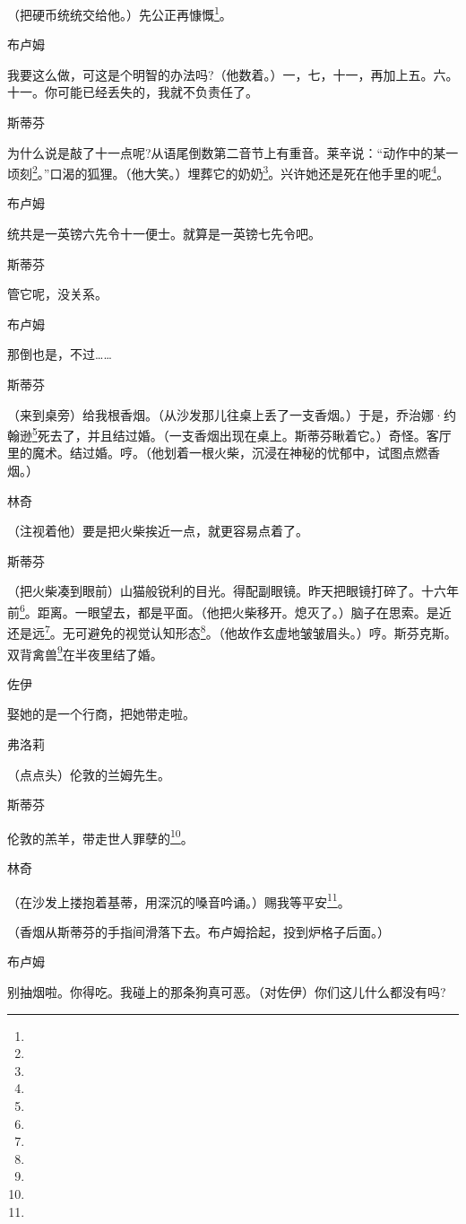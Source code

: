 \par （把硬币统统交给他。）先公正再慷慨\footnote{}。
\par 布卢姆
\par 我要这么做，可这是个明智的办法吗?（他数着。）一，七，十一，再加上五。六。十一。你可能已经丢失的，我就不负责任了。
\par 斯蒂芬
\par 为什么说是敲了十一点呢?从语尾倒数第二音节上有重音。莱辛说：“动作中的某一顷刻\footnote{}。”口渴的狐狸。（他大笑。）埋葬它的奶奶\footnote{}。兴许她还是死在他手里的呢\footnote{}。
\par 布卢姆
\par 统共是一英镑六先令十一便士。就算是一英镑七先令吧。
\par 斯蒂芬
\par 管它呢，没关系。
\par 布卢姆
\par 那倒也是，不过……
\par 斯蒂芬
\par （来到桌旁）给我根香烟。（从沙发那儿往桌上丢了一支香烟。）于是，乔治娜·约翰逊\footnote{}死去了，并且结过婚。（一支香烟出现在桌上。斯蒂芬瞅着它。）奇怪。客厅里的魔术。结过婚。哼。（他划着一根火柴，沉浸在神秘的忧郁中，试图点燃香烟。）
\par 林奇
\par （注视着他）要是把火柴挨近一点，就更容易点着了。
\par 斯蒂芬
\par （把火柴凑到眼前）山猫般锐利的目光。得配副眼镜。昨天把眼镜打碎了。十六年前\footnote{}。距离。一眼望去，都是平面。（他把火柴移开。熄灭了。）脑子在思索。是近还是远\footnote{}。无可避免的视觉认知形态\footnote{}。（他故作玄虚地皱皱眉头。）哼。斯芬克斯。双背禽兽\footnote{}在半夜里结了婚。
\par 佐伊
\par 娶她的是一个行商，把她带走啦。
\par 弗洛莉
\par （点点头）伦敦的兰姆先生。
\par 斯蒂芬
\par 伦敦的羔羊，带走世人罪孽的\footnote{}。
\par 林奇
\par （在沙发上搂抱着基蒂，用深沉的嗓音吟诵。）赐我等平安\footnote{}。
\par （香烟从斯蒂芬的手指间滑落下去。布卢姆拾起，投到炉格子后面。）
\par 布卢姆
\par 别抽烟啦。你得吃。我碰上的那条狗真可恶。（对佐伊）你们这儿什么都没有吗?
